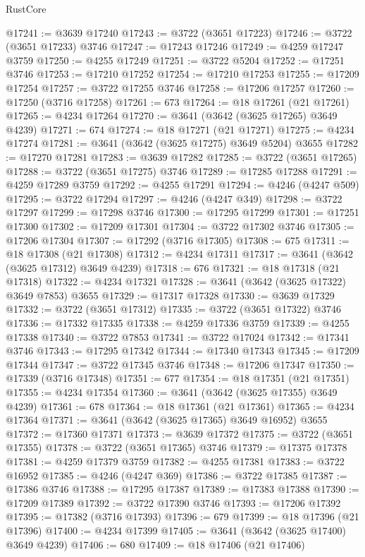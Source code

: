 \begin{lexlean}{RustCore}
\begin{coremodule}
@17241 := @3639 @17240
@17243 := @3722 (@3651 @17223)
@17246 := @3722 (@3651 @17233) @3746
@17247 := @17243 @17246
@17249 := @4259 @17247 @3759
@17250 := @4255 @17249
@17251 := @3722 @5204
@17252 := @17251 @3746
@17253 := @17210 @17252
@17254 := @17210 @17253
@17255 := @17209 @17254
@17257 := @3722 @17255 @3746
@17258 := @17206 @17257
@17260 := @17250 (@3716 @17258)
@17261 := 673
@17264 := @18 @17261 (@21 @17261)
@17265 := @4234 @17264
@17270 := @3641 (@3642 (@3625 @17265) @3649 @4239)
@17271 := 674
@17274 := @18 @17271 (@21 @17271)
@17275 := @4234 @17274
@17281 := @3641 (@3642 (@3625 @17275) @3649 @5204) @3655
@17282 := @17270 @17281
@17283 := @3639 @17282
@17285 := @3722 (@3651 @17265)
@17288 := @3722 (@3651 @17275) @3746
@17289 := @17285 @17288
@17291 := @4259 @17289 @3759
@17292 := @4255 @17291
@17294 := @4246 (@4247 @509)
@17295 := @3722 @17294
@17297 := @4246 (@4247 @349)
@17298 := @3722 @17297
@17299 := @17298 @3746
@17300 := @17295 @17299
@17301 := @17251 @17300
@17302 := @17209 @17301
@17304 := @3722 @17302 @3746
@17305 := @17206 @17304
@17307 := @17292 (@3716 @17305)
@17308 := 675
@17311 := @18 @17308 (@21 @17308)
@17312 := @4234 @17311
@17317 := @3641 (@3642 (@3625 @17312) @3649 @4239)
@17318 := 676
@17321 := @18 @17318 (@21 @17318)
@17322 := @4234 @17321
@17328 := @3641 (@3642 (@3625 @17322) @3649 @7853) @3655
@17329 := @17317 @17328
@17330 := @3639 @17329
@17332 := @3722 (@3651 @17312)
@17335 := @3722 (@3651 @17322) @3746
@17336 := @17332 @17335
@17338 := @4259 @17336 @3759
@17339 := @4255 @17338
@17340 := @3722 @7853
@17341 := @3722 @17024
@17342 := @17341 @3746
@17343 := @17295 @17342
@17344 := @17340 @17343
@17345 := @17209 @17344
@17347 := @3722 @17345 @3746
@17348 := @17206 @17347
@17350 := @17339 (@3716 @17348)
@17351 := 677
@17354 := @18 @17351 (@21 @17351)
@17355 := @4234 @17354
@17360 := @3641 (@3642 (@3625 @17355) @3649 @4239)
@17361 := 678
@17364 := @18 @17361 (@21 @17361)
@17365 := @4234 @17364
@17371 := @3641 (@3642 (@3625 @17365) @3649 @16952) @3655
@17372 := @17360 @17371
@17373 := @3639 @17372
@17375 := @3722 (@3651 @17355)
@17378 := @3722 (@3651 @17365) @3746
@17379 := @17375 @17378
@17381 := @4259 @17379 @3759
@17382 := @4255 @17381
@17383 := @3722 @16952
@17385 := @4246 (@4247 @369)
@17386 := @3722 @17385
@17387 := @17386 @3746
@17388 := @17295 @17387
@17389 := @17383 @17388
@17390 := @17209 @17389
@17392 := @3722 @17390 @3746
@17393 := @17206 @17392
@17395 := @17382 (@3716 @17393)
@17396 := 679
@17399 := @18 @17396 (@21 @17396)
@17400 := @4234 @17399
@17405 := @3641 (@3642 (@3625 @17400) @3649 @4239)
@17406 := 680
@17409 := @18 @17406 (@21 @17406)

\end{coremodule}
\end{lexlean}
